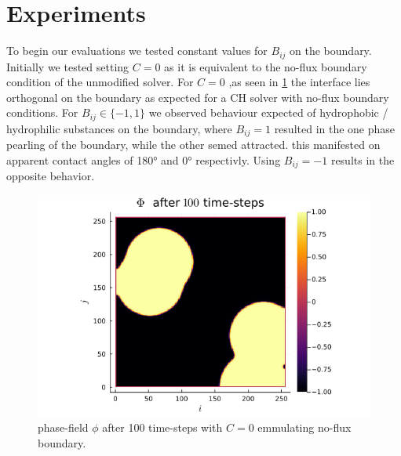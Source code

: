 \documentclass{mimosis}
\begin{document}
\section{Experiments}
\label{sec:orgcc83298}
To begin our evaluations we tested constant values for \(B_{ij}\) on the boundary.
Initially we tested setting \(C=0\) as it is equivalent to the no-flux boundary condition of the unmodified solver. For \(C = 0\) ,as seen in \ref{fig:angle0} the interface lies orthogonal on the boundary as expected for a CH solver with no-flux boundary conditions.
For \(B_{ij} \in \{-1,1\}\) we observed behaviour expected of hydrophobic / hydrophilic substances on the boundary, where \(B_{ij}=1\) resulted in the one phase pearling of the boundary, while the other semed attracted. this manifested on apparent contact angles of 180° and 0° respectivly. Using \(B_{ij} = -1\) results in the opposite behavior.


\begin{figure}[htbp]
\centering
\includegraphics[width=.9\linewidth]{images/baseline.png}
\caption{\label{fig:angle0}phase-field \(\phi\) after 100 time-steps with \(C=0\) emmulating no-flux boundary.}
\end{figure}
\end{document}
